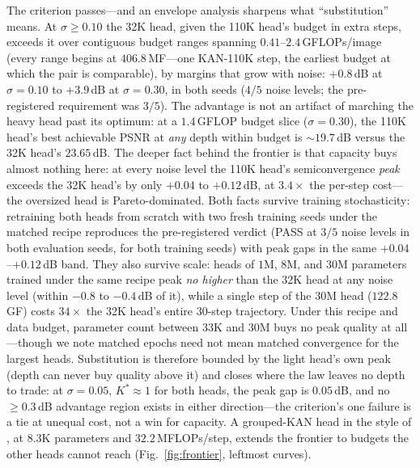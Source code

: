 \documentclass[letterpaper]{article}
\begin{document}
The criterion passes---and an envelope analysis sharpens what ``substitution'' means. At
$\sigma\geq0.10$ the 32K head, given the 110K head's budget in extra steps, exceeds it over contiguous
budget ranges spanning $0.41$--$2.4$\,GFLOPs/image (every range begins at $406.8$\,MF---one KAN-110K
step, the earliest budget at which the pair is comparable), by margins that grow with noise: $+0.8$\,dB
at $\sigma{=}0.10$ to $+3.9$\,dB at $\sigma{=}0.30$, in both seeds ($4/5$ noise levels; the
pre-registered requirement was $3/5$). The advantage is not an artifact of marching the heavy head past
its optimum: at a $1.4$\,GFLOP budget slice ($\sigma{=}0.30$), the 110K head's best achievable PSNR at
\emph{any} depth within budget is ${\sim}19.7$\,dB versus the 32K head's $23.65$\,dB. The deeper fact
behind the frontier is that capacity buys almost nothing here: at every noise level the 110K head's
semiconvergence \emph{peak} exceeds the 32K head's by only $+0.04$ to $+0.12$\,dB, at $3.4\times$ the
per-step cost---the oversized head is Pareto-dominated. Both facts survive training stochasticity:
retraining both heads from scratch with two fresh training seeds under the matched recipe reproduces the
pre-registered verdict (PASS at $3/5$ noise levels in both evaluation seeds, for both training seeds)
with peak gaps in the same $+0.04$--$+0.12$\,dB band. They also survive scale: heads of $1$M, $8$M, and
$30$M parameters trained under the same recipe peak \emph{no higher} than the 32K head at any noise
level (within $-0.8$ to $-0.4$\,dB of it), while a single step of the $30$M head ($122.8$\,GF) costs
$34\times$ the 32K head's entire $30$-step trajectory. Under this recipe and data budget, parameter
count between $33$K and $30$M buys no peak quality at all---though we note matched epochs need not mean
matched convergence for the largest heads. Substitution is therefore bounded by the light
head's own peak (depth can never buy quality above it) and closes where the law leaves no depth to trade:
at $\sigma{=}0.05$, $K^{*}{\approx}1$ for both heads, the peak gap is $0.05$\,dB, and no
${\geq}0.3$\,dB advantage region exists in either direction---the criterion's one failure is a tie at
unequal cost, not a win for capacity. A grouped-KAN head in the style of \citet{yang2025kat}, at $8.3$K
parameters and $32.2$\,MFLOPs/step, extends the frontier to budgets the other heads cannot reach
(Fig.~\ref{fig:frontier}, leftmost curves).
\end{document}
